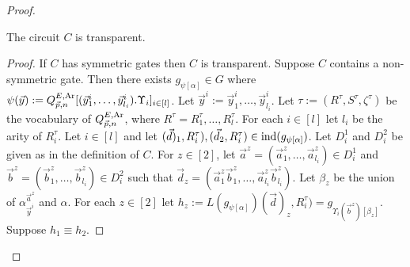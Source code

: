 \documentclass[../main/thesis.tex]{subfiles}
\begin{document}
\begin{proof}

\begin{claim}
  The circuit $C$ is transparent.
  \label{claim:circuit-translation-transparent}
\end{claim}
\begin{proof}
  If $C$ has symmetric gates then $C$ is transparent. Suppose $C$ contains a
  non-symmetric gate. Then there exists $g_{\psi[\alpha]}\in G$ where $\psi
  (\vec{y}) := Q^{E, \text{\upshape Ar}}_{\vec{p}, n} [(\vec{y}^i_1, \ldots, \vec{y}^i_{l_i}) .
  \Upsilon_i]_{i \in [l]}$. Let $\vec{y}^i := \vec{y}^i_1, \ldots,
  \vec{y}^i_{l_i}$. Let $\tau := (R^\tau, S^\tau, \zeta^\tau)$ be the vocabulary
  of $Q^{E, \text{\upshape Ar}}_{\vec{p}, n}$, where $R^\tau = {R^\tau_1, \ldots, R^\tau_l}$.
  For each $i \in [l]$ let $l_i$ be the arity of $R^\tau_i$. Let $i \in [l]$ and
  let $(\vec{d})_1, R^\tau_i), (\vec{d}_2, R^{\tau}_i) \in
  \text{\upshape ind}(g_{\psi[\alpha]})$. Let $D^1_i$ and $D^2_i$ be given as in the definition
  of $C$. For $z \in [2]$, let $\vec{a}^z = (\vec{a}^z_1, \ldots,
  \vec{a}^z_{l_i}) \in D^1_i$ and $\vec{b}^z = (\vec{b}^z_1, \ldots,
  \vec{b}^z_{l_i}) \in D^2_i$ such that $\vec{d}_z = (\vec{a}^z_1\vec{b}^z_1,
  \ldots, \vec{a}^z_{l_i}\vec{b}^z_{l_i})$. Let $\beta_z$ be the union of
  $\alpha^{\vec{a}^z}_{\vec{y}^i}$ and $\alpha$. For each $z \in [2]$ let $h_z
  := L(g_{\psi[\alpha]})(\vec{d})_z, R^\tau_i) =
  g_{\Upsilon_i(\vec{b}^z)[\beta_z]}$. Suppose $h_1 \equiv h_2$.



\end{proof}
\end{proof}
\end{document}
